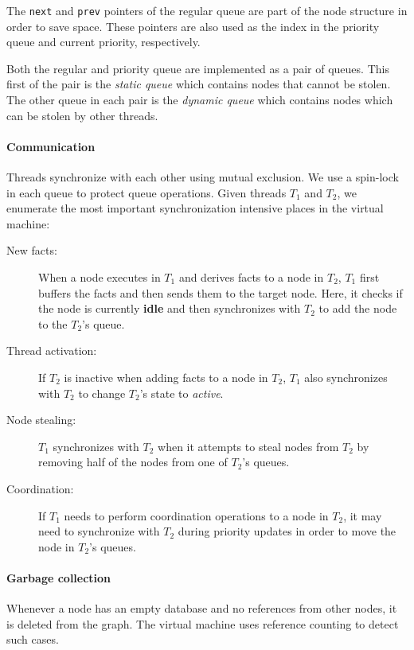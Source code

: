 The \texttt{next} and \texttt{prev} pointers of the regular queue are
part of the node structure in order to save space. These pointers are
also used as the index in the priority queue and current priority,
respectively.

Both the regular and priority queue are implemented as a pair of
queues.  This first of the pair is the \emph{static queue} which
contains nodes that cannot be stolen.  The other queue in each pair is
the \emph{dynamic queue} which contains nodes which can be stolen by
other threads.

\paragraph{Communication}

Threads synchronize with each other using mutual exclusion. We use a spin-lock in
each queue to protect queue operations.
Given threads $T_1$ and $T_2$, we enumerate the most important
synchronization intensive places in the virtual machine:

\begin{description}
   \item[New facts:] When a node executes in $T_1$ and derives facts
   to a node in $T_2$, $T_1$ first buffers the facts 
   and then sends them to the target node. Here, it checks if the
   node is currently \textbf{idle} and then synchronizes with $T_2$ to add the
   node to the $T_2$'s queue.
   \item[Thread activation:] If $T_2$ is inactive when adding facts to a node in
   $T_2$, $T_1$ also synchronizes with $T_2$ to change $T_2$'s state to \emph{active}.
   \item[Node stealing:] $T_1$ synchronizes with $T_2$ when it attempts to steal
   nodes from $T_2$ by removing half of the nodes from one of $T_2$'s queues.
   \item[Coordination:] If $T_1$ needs to perform coordination operations
   to a node in $T_2$, it may need to synchronize with $T_2$ during priority
   updates in order to move the node in $T_2$'s queues.
\end{description}

\paragraph{Garbage collection}

Whenever a node has an empty database and no references from other nodes, it is
deleted from the graph. The virtual machine uses reference counting to detect
such cases.

